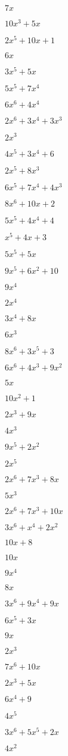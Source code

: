 \documentclass{article}
\begin{document}
\begin{multicols}{3}
$7x$\item $10x^{3}+5x$\item $2x^{5}+10x+1$\item $6x$\item $3x^{5}+5x$\item $5x^{5}+7x^{4}$\item $6x^{6}+4x^{4}$\item $2x^{6}+3x^{4}+3x^{3}$\item $2x^{3}$\item $4x^{5}+3x^{4}+6$\item $2x^{5}+8x^{3}$\item $6x^{5}+7x^{4}+4x^{3}$\item $8x^{6}+10x+2$\item $5x^{5}+4x^{4}+4$\item $x^{5}+4x+3$\item $5x^{5}+5x$\item $9x^{5}+6x^2+10$\item $9x^{4}$\item $2x^{4}$\item $3x^{4}+8x$\item $6x^{3}$\item $8x^{6}+3x^{5}+3$\item $6x^{6}+4x^{3}+9x^2$\item $5x$\item $10x^2+1$\item $2x^{3}+9x$\item $4x^{3}$\item $9x^{5}+2x^2$\item $2x^{5}$\item $2x^{6}+7x^{3}+8x$\item $5x^{3}$\item $2x^{6}+7x^{3}+10x$\item $3x^{6}+x^{4}+2x^2$\item $10x+8$\item $10x$\item $9x^{4}$\item $8x$\item $3x^{6}+9x^{4}+9x$\item $6x^{5}+3x$\item $9x$\item $2x^{3}$\item $7x^{6}+10x$\item $2x^{3}+5x$\item $6x^{4}+9$\item $4x^{5}$\item $3x^{6}+5x^{5}+2x$\item $4x^2$\it
\end{multicols}
\end{document}
